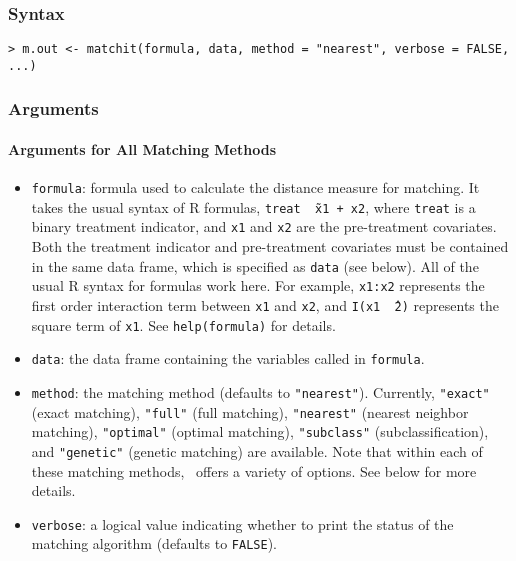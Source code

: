 \subsubsection{Syntax}
\begin{verbatim}
> m.out <- matchit(formula, data, method = "nearest", verbose = FALSE, ...)
\end{verbatim}

\subsubsection{Arguments}

\paragraph{Arguments for All Matching Methods}

\begin{itemize}

\item \texttt{formula}: formula used to calculate the distance measure
  for matching.  It takes the usual syntax of R formulas, {\tt treat
    \~\ x1 + x2}, where {\tt treat} is a binary treatment indicator,
  and {\tt x1} and {\tt x2} are the pre-treatment covariates. Both the
  treatment indicator and pre-treatment covariates must be contained
  in the same data frame, which is specified as {\tt data} (see
  below).  All of the usual R syntax for formulas work here. For
  example, {\tt x1:x2} represents the first order interaction term
  between {\tt x1} and {\tt x2}, and {\tt I(x1 \^\ 2)} represents the
  square term of {\tt x1}. See {\tt help(formula)} for details.
  
\item \texttt{data}: the data frame containing the variables called in
  {\tt formula}.  
  
\item \texttt{method}: the matching method (defaults to
  \texttt{"nearest"}).  Currently, \texttt{"exact"} (exact matching),
  \texttt{"full"} (full matching), \texttt{"nearest"} (nearest
  neighbor matching), \texttt{"optimal"} (optimal matching),
  \texttt{"subclass"} (subclassification), and \texttt{"genetic"}
  (genetic matching) are available. Note that within each of these
  matching methods, \MatchIt\ offers a variety of options.  See below
  for more details.
  
\item \texttt{verbose}: a logical value indicating whether to print
  the status of the matching algorithm (defaults to \texttt{FALSE}).
\end{itemize}



